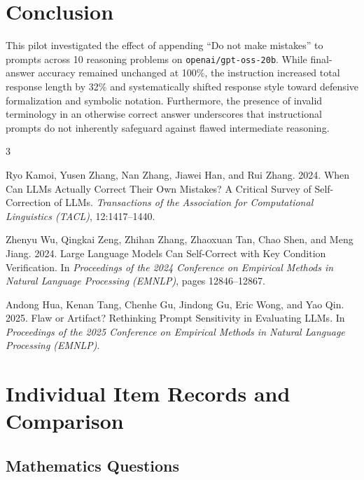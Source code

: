\documentclass[11pt,a4paper]{article}
\begin{document}
\section{Conclusion}

This pilot investigated the effect of appending ``Do not make mistakes'' to prompts across 10 reasoning problems on \texttt{openai/gpt-oss-20b}. While final-answer accuracy remained unchanged at 100\%, the instruction increased total response length by 32\% and systematically shifted response style toward defensive formalization and symbolic notation. Furthermore, the presence of invalid terminology in an otherwise correct answer underscores that instructional prompts do not inherently safeguard against flawed intermediate reasoning.

\begin{thebibliography}{3}

Ryo Kamoi, Yusen Zhang, Nan Zhang, Jiawei Han, and Rui Zhang. 2024.
\newblock When Can {LLMs} Actually Correct Their Own Mistakes? A Critical Survey of Self-Correction of {LLMs}.
\newblock \emph{Transactions of the Association for Computational Linguistics (TACL)}, 12:1417--1440.

Zhenyu Wu, Qingkai Zeng, Zhihan Zhang, Zhaoxuan Tan, Chao Shen, and Meng Jiang. 2024.
\newblock Large Language Models Can Self-Correct with Key Condition Verification.
\newblock In \emph{Proceedings of the 2024 Conference on Empirical Methods in Natural Language Processing (EMNLP)}, pages 12846--12867.

Andong Hua, Kenan Tang, Chenhe Gu, Jindong Gu, Eric Wong, and Yao Qin. 2025.
\newblock Flaw or Artifact? Rethinking Prompt Sensitivity in Evaluating {LLMs}.
\newblock In \emph{Proceedings of the 2025 Conference on Empirical Methods in Natural Language Processing (EMNLP)}.

\end{thebibliography}

\appendix

\section{Individual Item Records and Comparison}

\subsection{Mathematics Questions}
\end{document}
